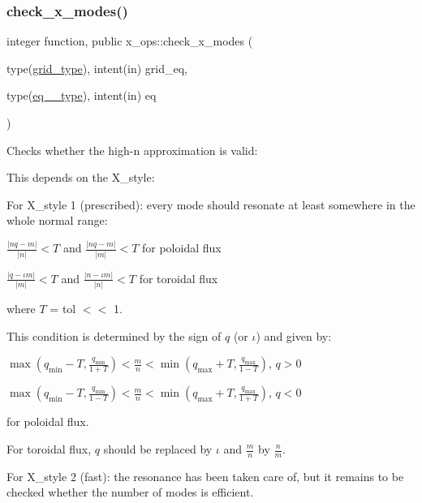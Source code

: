 \subsubsection{\texorpdfstring{check\+\_\+x\+\_\+modes()}{check\_x\_modes()}}
{\footnotesize\ttfamily integer function, public x\+\_\+ops\+::check\+\_\+x\+\_\+modes (\begin{DoxyParamCaption}\item[{type(\hyperlink{structgrid__vars_1_1grid__type}{grid\+\_\+type}), intent(in)}]{grid\+\_\+eq,  }\item[{type(\hyperlink{structeq__vars_1_1eq__1__type}{eq\+\_\+1\+\_\+type}), intent(in)}]{eq }\end{DoxyParamCaption})}



Checks whether the high-\/n approximation is valid\+: 

This depends on the {\ttfamily X\+\_\+style\+:} 

For X\+\_\+style 1 (prescribed)\+: every mode should resonate at least somewhere in the whole normal range\+:
\begin{DoxyItemize}
\item $\frac{\left|nq-m\right|}{\left|n\right|} < T$ and $\frac{\left|nq-m\right|}{\left|m\right|} < T$ for poloidal flux
\item $\frac{\left|q-\iota m\right|}{\left|m\right|} < T$ and $\frac{\left|n-\iota m\right|}{\left|n\right|} < T$ for toroidal flux
\end{DoxyItemize}

where $T$ = {\ttfamily tol} $<$$<$ 1.

This condition is determined by the sign of $q$ (or $\iota$) and given by\+:
\begin{DoxyItemize}
\item $\max\left(q_\text{min}-T,\frac{q_\text{min}}{1+T}\right) < \frac{m}{n} < \min\left(q_\text{max}+T,\frac{q_\text{max}}{1-T}\right)$, $q>0$
\item $\max\left(q_\text{min}-T,\frac{q_\text{min}}{1-T}\right) < \frac{m}{n} < \min\left(q_\text{max}+T,\frac{q_\text{max}}{1+T}\right)$, $q<0$
\end{DoxyItemize}

for poloidal flux.

For toroidal flux, $q$ should be replaced by $\iota$ and $\frac{m}{n}$ by $\frac{n}{m}$.

For {\ttfamily X\+\_\+style} 2 (fast)\+: the resonance has been taken care of, but it remains to be checked whether the number of modes is efficient.

